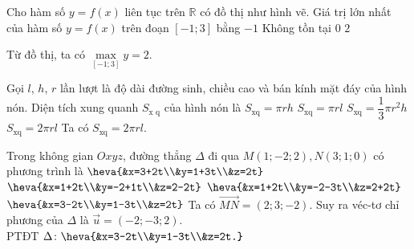 \begin{ex}%
\immini
{
Cho hàm số $y=f(x)$ liên tục trên $\mathbb{R}$ có đồ thị như hình vẽ. Giá trị lớn nhất của hàm số $y=f(x)$ trên đoạn $[-1;3]$ bằng
\choice
{$-1$}
{Không tồn tại}
{$0$}
{\True $2$}
}
{
}
\loigiai
{
Từ đồ thị, ta có $\max\limits_{[-1;3]} y=2$.
}
\end{ex}
\begin{ex}%
Gọi $l$, $h$, $r$ lần lượt là độ dài đường sinh, chiều cao và bán kính mặt đáy của hình nón. Diện tích xung quanh $S_{\text{x q}}$ của hình nón là
\choice
{$S_{\text{xq}}=\pi r h$}
{$S_{\text{xq}}=\pi r l$}
{$S_{\text{xq}}=\dfrac{1}{3}\pi r^2h$}
{\True $S_{\text{xq}}=2\pi r l$}
\loigiai
{
Ta có $S_{\text{xq}}=2\pi r l$.
}
\end{ex}

\begin{ex}%
Trong không gian $O x y z$, đường thẳng $\Delta$ đi qua $M(1;-2;2),N(3;1;0)$ có phương trình là
\choice
{$\heva{&x=3+2t\\&y=1+3t\\&z=2t}$}
{$\heva{&x=1+2t\\&y=-2+1t\\&z=2-2t}$}
{$\heva{&x=1+2t\\&y=-2-3t\\&z=2+2t}$}
{\True $\heva{&x=3-2t\\&y=1-3t\\&z=2t}$}
\loigiai
{
Ta có $\overrightarrow{MN}=(2;3;-2)$. Suy ra véc-tơ chỉ phương của $\Delta$ là $\overrightarrow{u}=(-2;-3;2)$.\\
PTĐT $\Delta\colon \heva{&x=3-2t\\&y=1-3t\\&z=2t.}$
}
\end{ex}

